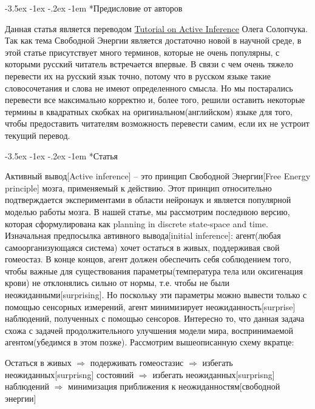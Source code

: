 \documentclass[twoside,leqno, 11pt]{article}
\author{Махнева Елизавета, Брсикян Бабкен \\ БЭК171}
\makeatletter
\renewcommand\section{\@startsection{section}{1}{\z@}%
        {-3.5ex \@plus -1ex \@minus -.2ex}%
        {-1em}%
        {\normalfont\large\scshape\bfseries}}
\makeatother
\begin{document}
	
\section*{Предисловие от авторов}~\

	Данная статья является переводом \href{https://medium.com/@solopchuk/tutorial-on-active-inference-30edcf50f5dc}{Tutorial on Active Inference} Олега Солопчука. Так как тема Свободной Энергии является достаточно новой в научной среде, в этой статье присутствует много терминов, которые не очень популярны, с которыми русский читатель встречается впервые. В связи с чем очень тяжело перевести их на русский язык точно, потому что в русском языке такие словосочетания и слова не имеют определенного смысла. Но мы постарались перевести все максимально корректно и, более того, решили оставить некоторые термины в квадратных скобках на оригинальном(английском) языке для того, чтобы предоставить читателям возможность перевести самим, если их не устроит текущий перевод.

\section*{Статья}~\

	Активный вывод[Active inference] -- это принцип Свободной Энергии[Free Energy principle] мозга, применяемый к действию. Этот принцип относительно подтверждается экспериментами в области нейронаук и является популярной моделью работы мозга. В нашей статье, мы рассмотрим последнюю версию, которая сформулирована как planning in discrete state-space and time. Изначальная предпосылка автивного вывода[initial inference]: агент(любая самоорганизующаяся система) хочет остаться в живых, поддерживая свой гомеостаз. В конце концов, агент должен обеспечить себя соблюдением того, чтобы важные для существования параметры(температура тела или оксигенация крови) не отклонялись сильно от нормы, т.е. чтобы не были неожиданными[surprising]. Но поскольку эти параметры можно вывести только с помощью сенсорных измерений, агент минимизирует неожиданность[surprise] наблюдений, полученных с помощью сенсоров. Интересно то, что данная задача схожа с задачей продолжительного улучшения модели мира, воспринимаемой агентом(убедимся в этом позже). Рассмотрим вышеописанную схему вкратце:
	
\begin{center}
	Остаться в живых $\Rightarrow$ подерживать гомеостазис $\Rightarrow$ избегать неожиданных[surprisng] состояний $\Rightarrow$ избегать неожиданных[surprisng] наблюдений $\Rightarrow$ минимизация приближения к неожиданностям[свободной энергии]
\end{center}
	
\end{document}
